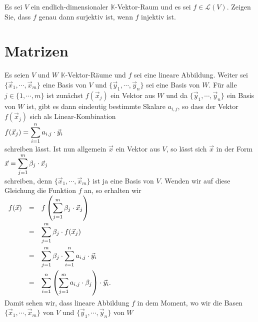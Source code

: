 \exercise
Es sei $V$ ein endlich-dimensionaler $\mathbb{K}$-Vektor-Raum und es sei $f \in \mathcal{L}(V)$.
Zeigen Sie, dass $f$ genau dann surjektiv ist, wenn $f$ injektiv ist. \exend


\section{Matrizen}
Es seien $V$ und $W$ $\mathbb{K}$-Vektor-R\"{a}ume und $f$ sei eine lineare Abbildung.  Weiter sei
$\{ \vec{x}_1, \cdots, \vec{x}_m \}$ eine Basis von $V$ und 
$\{ \vec{y}_1, \cdots, \vec{y}_n \}$ sei eine Basis von $W$.  F\"{u}r alle $j \in \{1,\cdots,m\}$ ist zun\"{a}chst
$f(\vec{x}_j)$ ein Vektor aus $W$ und da $\{ \vec{y}_1, \cdots, \vec{y}_n \}$ ein Basis von $W$ ist, 
gibt es dann eindeutig bestimmte Skalare $a_{i,j}$, so dass der Vektor $f(\vec{x}_j)$ sich als
Linear-Kombination 
\\[0.2cm]
\hspace*{1.3cm}
$\displaystyle f(\vec{x}_j) = \sum\limits_{i=1}^n a_{i,j} \cdot \vec{y}_i$
\\[0.2cm]
schreiben l\"{a}sst.  Ist nun allgemein $\vec{x}$ ein Vektor aus $V$, so l\"{a}sst sich $\vec{x}$ in der Form 
\\[0.2cm]
\hspace*{1.3cm}
$\displaystyle\vec{x} = \sum\limits_{j=1}^m \beta_j \cdot \vec{x}_j$
\\[0.2cm]
schreiben, denn $\{ \vec{x}_1, \cdots, \vec{x}_m \}$ ist ja eine Basis von $V$.  Wenden wir auf diese Gleichung die Funktion $f$ an, 
so erhalten wir
\\[0.2cm]
\hspace*{1.3cm}
$
\begin{array}[t]{lcl}
  f(\vec{x}) & = & \displaystyle f\left(\sum\limits_{j=1}^m \beta_j \cdot \vec{x}_j\right)                    \\[0.5cm]
             & = & \displaystyle \sum\limits_{j=1}^m \beta_j \cdot f(\vec{x}_j)                               \\[0.5cm]
             & = & \displaystyle \sum\limits_{j=1}^m \beta_j \cdot \sum\limits_{i=1}^n a_{i,j} \cdot \vec{y}_i \\[0.5cm]
             & = & \displaystyle \sum\limits_{i=1}^n \left(\sum\limits_{j=1}^m a_{i,j} \cdot \beta_j\right) \cdot \vec{y}_i. \\[0.5cm]
\end{array}
$
\\[0.2cm]
Damit sehen wir, dass lineare Abbildung $f$ in dem Moment, wo wir die Basen
$\{ \vec{x}_1, \cdots, \vec{x}_m \}$ von $V$ und $\{ \vec{y}_1, \cdots, \vec{y}_n \}$ von $W$

